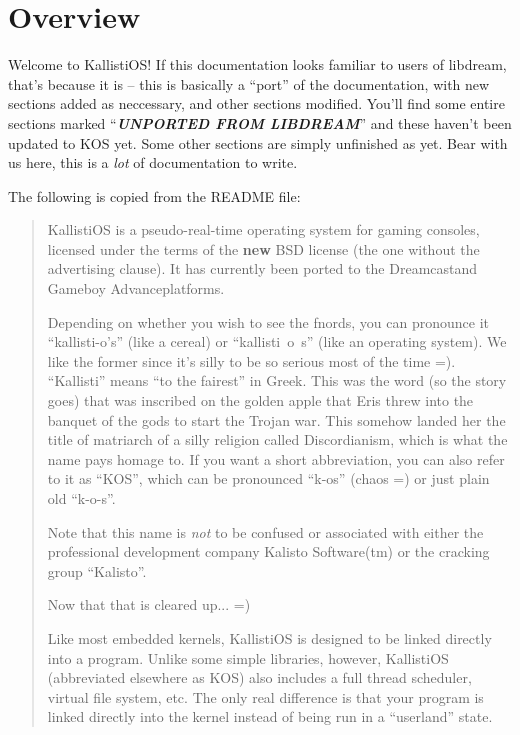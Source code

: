 \documentclass[english]{report}
\begin{document}

\chapter{Overview}

Welcome to KallistiOS! If this documentation looks familiar to users
of libdream, that's because it is -- this is basically a ``port''
of the documentation, with new sections added as neccessary, and other
sections modified. You'll find some entire sections marked
``\textbf{\emph{UNPORTED FROM LIBDREAM}}''
and these haven't been updated to KOS yet. Some
other sections are simply unfinished as yet. Bear with us here, this
is a \emph{lot} of documentation to write.

The following is copied from the README file:

\begin{quote}
KallistiOS is a pseudo-real-time operating system for gaming consoles,
licensed under the terms of the \textbf{new} BSD license (the one
without the advertising clause). It has currently been ported to the
Dreamcast\tm and Gameboy Advance\tm platforms.

Depending on whether you wish to see the fnords, you can pronounce
it ``kallisti-o's'' (like a cereal) or ``kallisti~o~s'' (like an operating
system). We like the former since
it's silly to be so serious most of the time =). ``Kallisti''
means ``to the fairest'' in Greek. This was the word
(so the story goes) that was inscribed on the golden apple that Eris
threw into the banquet of the gods to start the Trojan war. This somehow
landed her the title of matriarch of a silly religion called Discordianism,
which is what the name pays homage to. If you want a short abbreviation,
you can also refer to it as ``KOS'', which can be
pronounced ``k-os'' (chaos =) or just plain old ``k-o-s''.

Note that this name is \emph{not} to be confused or associated with either
the professional development company Kalisto Software(tm) or the cracking
group ``Kalisto''.

Now that that is cleared up... =)

Like most embedded kernels, KallistiOS is designed to be linked directly
into a program. Unlike some simple libraries, however, KallistiOS
(abbreviated elsewhere as KOS) also includes a full thread scheduler,
virtual file system, etc. The only real difference is that your program
is linked directly into the kernel instead of being run in a {}``userland''
state.

\end{quote}
\end{document}
